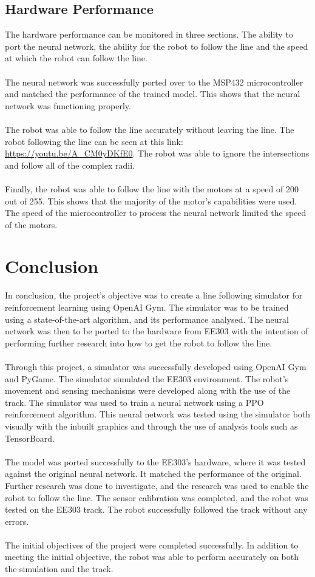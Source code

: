 \documentclass[a4paper,12pt]{article}
\begin{document}
\subsection{Hardware Performance}
The hardware performance can be monitored in three sections. The ability to port the neural network, the ability for the robot to follow the line and the speed at which the robot can follow the line. 
\\\\
The neural network was successfully ported over to the MSP432 microcontroller and matched the performance of the trained model. This shows that the neural network was functioning properly. 
\\\\
The robot was able to follow the line accurately without leaving the line. The robot following the line can be seen at this link: \url{https://youtu.be/A_CM0yDKfE0}. The robot was able to ignore the intersections and follow all of the complex radii. 
\\\\
Finally, the robot was able to follow the line with the motors at a speed of 200 out of 255. This shows that the majority of the motor's capabilities were used. The speed of the microcontroller to process the neural network limited the speed of the motors.


\section{Conclusion}
In conclusion, the project's objective was to create a line following simulator for reinforcement learning using OpenAI Gym. The simulator was to be trained using a state-of-the-art algorithm, and its performance analysed. The neural network was then to be ported to the hardware from EE303 with the intention of performing further research into how to get the robot to follow the line. 
\\\\
Through this project, a simulator was successfully developed using OpenAI Gym and PyGame. The simulator simulated the EE303 environment. The robot's movement and sensing mechanisms were developed along with the use of the track. The simulator was used to train a neural network using a PPO reinforcement algorithm. This neural network was tested using the simulator both visually with the inbuilt graphics and through the use of analysis tools such as TensorBoard. 
\\\\
The model was ported successfully to the EE303's hardware, where it was tested against the original neural network. It matched the performance of the original. Further research was done to investigate, and the research was used to enable the robot to follow the line. The sensor calibration was completed, and the robot was tested on the EE303 track. The robot successfully followed the track without any errors. 
\\\\
The initial objectives of the project were completed successfully. In addition to meeting the initial objective, the robot was able to perform accurately on both the simulation and the track.
\end{document}
